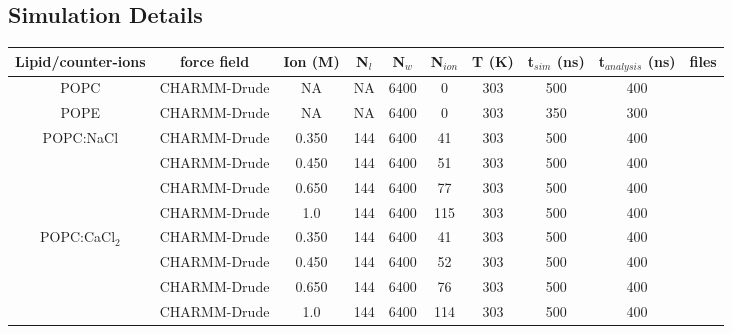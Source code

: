 \documentclass[journal=jacsat,manuscript=article,layout=singlecolumn]{achemso}
\begin{document}
\subsection{Simulation Details}

\newpage
\begin{adjustbox}{angle=90}
\begin{tabular}{cccccccccc}
	Lipid/counter-ions                & force field  & Ion (M) & N$_{l}$ & N$_{w}$ & N$_{ion}$ & T (K) & t$_{sim}$ (ns) & t$_{analysis}$ (ns) & files \\ \hline
POPC                              & CHARMM-Drude & NA      & NA       & 6400       & 0         & 303    & 500              & 400         &          \cite{kav_batuhan_2021_4604630}    \\ \hline
POPE                              & CHARMM-Drude & NA      & NA       & 6400       & 0         & 303    & 350              & 300         &          \cite{kav_batuhan_2021_4665773}    \\ \hline
	\multirow{4}{*}{POPC:NaCl}        & CHARMM-Drude & 0.350   & 144      & 6400     & 41         & 303   & 500             & 400                  & \cite{kav_batuhan_2020_4683386}   \\
				  & CHARMM-Drude & 0.450   & 144      & 6400     & 51         & 303   & 500             & 400                  & \cite{kav_batuhan_2020_4683398}   \\
				  & CHARMM-Drude & 0.650   & 144      & 6400     & 77         & 303   & 500             & 400                  & \cite{kav_batuhan_2020_4683405}   \\
				  & CHARMM-Drude & 1.0     & 144      & 6400     & 115        & 303   & 500             & 400                  & \cite{kav_batuhan_2020_4683411}   \\ \hline
	\multirow{3}{*}{POPC:CaCl$_{2}$} & CHARMM-Drude & 0.350   & 144      & 6400     & 41         & 303   & 500             & 400                  & \cite{kav_batuhan_2020_4683393}   \\
				  & CHARMM-Drude & 0.450   & 144      & 6400     & 52         & 303   & 500             & 400                  & \cite{kav_batuhan_2020_4683391}   \\
				  & CHARMM-Drude & 0.650   & 144      & 6400     & 76         & 303   & 500             & 400                  & \cite{kav_batuhan_2020_4683394} \\
				  & CHARMM-Drude & 1.0   & 144      & 6400     & 114         & 303   & 500             & 400                  & \cite{kav_batuhan_2021_4738966}
				  
\end{tabular}
\end{adjustbox}
\end{document}
